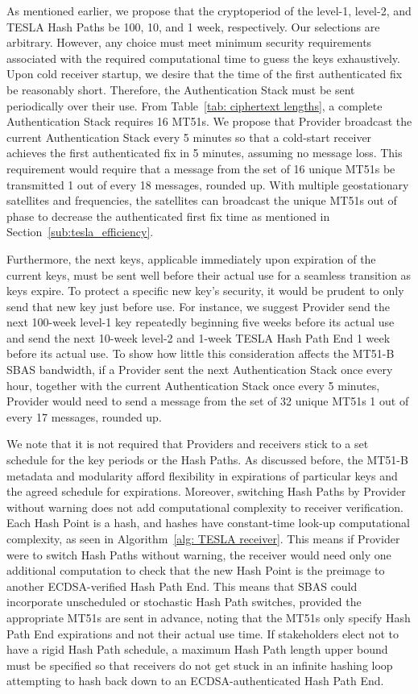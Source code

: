 \documentclass[letterpaper,times]{IONconf/IONconf}
\begin{document}
		As mentioned earlier, we propose that the cryptoperiod of the level-1, level-2, and TESLA Hash Paths be 100, 10, and 1 week, respectively.
		Our selections are arbitrary.
		However,  any choice must meet minimum security requirements associated with the required computational time to guess the keys exhaustively.
		Upon cold receiver startup, we desire that the time of the first authenticated fix be reasonably short.
		Therefore, the Authentication Stack must be sent periodically over their use.
		From Table~\ref{tab: ciphertext lengths}, a complete Authentication Stack requires 16 MT51s. 
		We propose that Provider broadcast the current Authentication Stack every 5 minutes so that a cold-start receiver achieves the first authenticated fix in 5 minutes, assuming no message loss.
		This requirement would require that a message from the set of 16 unique MT51s be transmitted 1 out of every 18 messages, rounded up.
		With multiple geostationary satellites and frequencies, the satellites can broadcast the unique MT51s out of phase to decrease the authenticated first fix time as mentioned in Section~\ref{sub:tesla_efficiency}.

		Furthermore, the next keys, applicable immediately upon expiration of the current keys, must be sent well before their actual use for a seamless transition as keys expire.
		To protect a specific new key's security, it would be prudent to only send that new key just before use.
		For instance, we suggest Provider send the next 100-week level-1 key repeatedly beginning five weeks before its actual use and send the next 10-week level-2 and 1-week TESLA Hash Path End 1 week before its actual use.
		To show how little this consideration affects the MT51-B SBAS bandwidth, if a Provider sent the next Authentication Stack once every hour, together with the current Authentication Stack once every 5 minutes, Provider would need to send a message from the set of 32 unique MT51s 1 out of every 17 messages, rounded up.

		We note that it is not required that Providers and receivers stick to a set schedule for the key periods or the Hash Paths.
		As discussed before, the MT51-B metadata and modularity afford flexibility in expirations of particular keys and the agreed schedule for expirations.
		Moreover, switching Hash Paths by Provider without warning does not add computational complexity to receiver verification.
		Each Hash Point is a hash, and hashes have constant-time look-up computational complexity, as seen in Algorithm~\ref{alg: TESLA receiver}.
		This means if Provider were to switch Hash Paths without warning, the receiver would need only one additional computation to check that the new Hash Point is the preimage to another ECDSA-verified Hash Path End.
		This means that SBAS could incorporate unscheduled or stochastic Hash Path switches, provided the appropriate MT51s are sent in advance, noting that the MT51s only specify Hash Path End expirations and not their actual use time.
		If stakeholders elect not to have a rigid Hash Path schedule, a maximum Hash Path length upper bound must be specified so that receivers do not get stuck in an infinite hashing loop attempting to hash back down to an ECDSA-authenticated Hash Path End.
\end{document}
